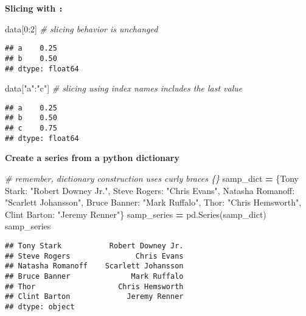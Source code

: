 \documentclass[
]{book}
\newenvironment{Shaded}{\begin{snugshade}}{\end{snugshade}}
\newcommand{\CommentTok}[1]{\textcolor[rgb]{0.56,0.35,0.01}{\textit{#1}}}
\newcommand{\DecValTok}[1]{\textcolor[rgb]{0.00,0.00,0.81}{#1}}
\newcommand{\NormalTok}[1]{#1}
\newcommand{\OperatorTok}[1]{\textcolor[rgb]{0.81,0.36,0.00}{\textbf{#1}}}
\newcommand{\StringTok}[1]{\textcolor[rgb]{0.31,0.60,0.02}{#1}}
\begin{document}
\textbf{Slicing with \texttt{:}}

\begin{Shaded}
\begin{Highlighting}[]
\NormalTok{data[}\DecValTok{0}\NormalTok{:}\DecValTok{2}\NormalTok{] }\CommentTok{\# slicing behavior is unchanged}
\end{Highlighting}
\end{Shaded}

\begin{verbatim}
## a    0.25
## b    0.50
## dtype: float64
\end{verbatim}

\begin{Shaded}
\begin{Highlighting}[]
\NormalTok{data[}\StringTok{"a"}\NormalTok{:}\StringTok{"c"}\NormalTok{] }\CommentTok{\# slicing using index names includes the last value}
\end{Highlighting}
\end{Shaded}

\begin{verbatim}
## a    0.25
## b    0.50
## c    0.75
## dtype: float64
\end{verbatim}

\textbf{Create a series from a python dictionary}

\begin{Shaded}
\begin{Highlighting}[]
\CommentTok{\# remember, dictionary construction uses curly braces \{\}}
\NormalTok{samp\_dict }\OperatorTok{=}\NormalTok{ \{}\StringTok{\textquotesingle{}Tony Stark\textquotesingle{}}\NormalTok{: }\StringTok{"Robert Downey Jr."}\NormalTok{,}
\StringTok{\textquotesingle{}Steve Rogers\textquotesingle{}}\NormalTok{: }\StringTok{"Chris Evans"}\NormalTok{,}
\StringTok{\textquotesingle{}Natasha Romanoff\textquotesingle{}}\NormalTok{: }\StringTok{"Scarlett Johansson"}\NormalTok{,}
\StringTok{\textquotesingle{}Bruce Banner\textquotesingle{}}\NormalTok{: }\StringTok{"Mark Ruffalo"}\NormalTok{,}
\StringTok{\textquotesingle{}Thor\textquotesingle{}}\NormalTok{: }\StringTok{"Chris Hemsworth"}\NormalTok{,}
\StringTok{\textquotesingle{}Clint Barton\textquotesingle{}}\NormalTok{: }\StringTok{"Jeremy Renner"}\NormalTok{\}}
\NormalTok{samp\_series }\OperatorTok{=}\NormalTok{ pd.Series(samp\_dict)}
\NormalTok{samp\_series}
\end{Highlighting}
\end{Shaded}

\begin{verbatim}
## Tony Stark           Robert Downey Jr.
## Steve Rogers               Chris Evans
## Natasha Romanoff    Scarlett Johansson
## Bruce Banner              Mark Ruffalo
## Thor                   Chris Hemsworth
## Clint Barton             Jeremy Renner
## dtype: object
\end{verbatim}
\end{document}
